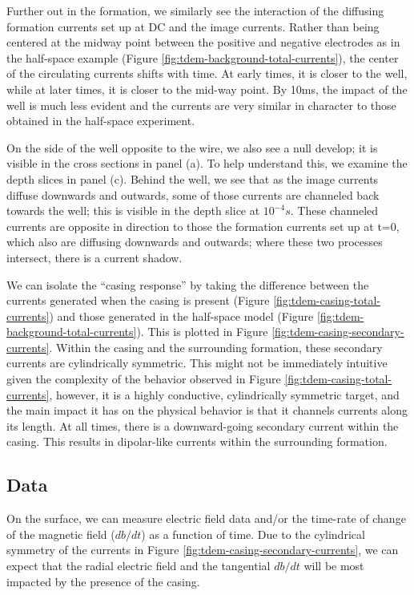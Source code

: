 Further out in the formation, we similarly see the interaction of the diffusing formation currents set up at DC and the image currents. Rather than being centered at the midway point between the positive and negative electrodes as in the half-space example (Figure \ref{fig:tdem-background-total-currents}), the center of the circulating currents shifts with time. At early times, it is closer to the well, while at later times, it is closer to the mid-way point. By 10ms, the impact of the well is much less evident and the currents are very similar in character to those obtained in the half-space experiment.

On the side of the well opposite to the wire, we also see a null develop; it is visible in the cross sections in panel (a). To help understand this, we examine the depth slices in panel (c). Behind the well, we see that as the image currents diffuse downwards and outwards, some of those currents are channeled back towards the well; this is visible in the depth slice at $10^{-4} s$. These channeled currents are opposite in direction to those the formation currents set up at t=0, which also are diffusing downwards and outwards; where these two processes intersect, there is a current shadow.

We can isolate the ``casing response'' by taking the difference between the currents generated when the casing is present (Figure \ref{fig:tdem-casing-total-currents}) and those generated in the half-space model (Figure \ref{fig:tdem-background-total-currents}). This is plotted in Figure \ref{fig:tdem-casing-secondary-currents}. Within the casing and the surrounding formation, these secondary currents are cylindrically symmetric. This might not be immediately intuitive given the complexity of the behavior observed in Figure \ref{fig:tdem-casing-total-currents}, however, it is a highly conductive, cylindrically symmetric target, and the main impact it has on the physical behavior is that it channels currents along its length. At all times, there is a downward-going secondary current within the casing. This results in dipolar-like currents within the surrounding formation.




\subsection{Data}

On the surface, we can measure electric field data and/or the time-rate of change of the magnetic field ($db/dt$) as a function of time. Due to the cylindrical symmetry of the currents in Figure \ref{fig:tdem-casing-secondary-currents}, we can expect that the radial electric field and the tangential $db/dt$ will be most impacted by the presence of the casing.

